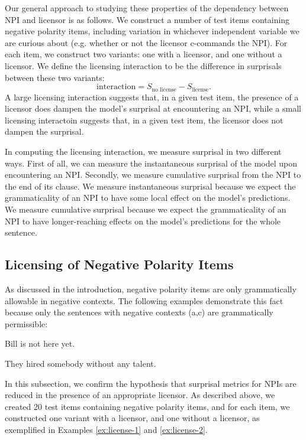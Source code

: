 \documentclass[11pt, round]{article}
\begin{document}
Our general approach to studying these properties of the dependency between NPI and licensor is as follows. We construct a number of test items containing negative polarity items, including variation in whichever independent variable we are curious about (e.g. whether or not the licensor c-commands the NPI). For each item, we construct two variants: one with a licensor, and one without a licensor. We define the licensing interaction to be the difference in surprisals between these two variants:
\[ \textrm{interaction} = S_{\textrm{no license}} - S_{\textrm{license}}. \]
A large licensing interaction suggests that, in a given test item, the presence of a licensor does dampen the model's surprisal at encountering an NPI, while a small licensing interactoin suggests that, in a given test item, the licensor does not dampen the surprisal.

In computing the licensing interaction, we measure surprisal in two different ways. First of all, we can measure the instantaneous surprisal of the model upon encountering an NPI. Secondly, we measure cumulative surprisal from the NPI to the end of its clause. We measure instantaneous surprisal because we expect the grammaticality of an NPI to have some local effect on the model's predictions. We measure cumulative surprisal because we expect the grammaticality of an NPI to have longer-reaching effects on the model's predictions for the whole sentence.

\subsection{Licensing of Negative Polarity Items}
\label{sec:basic}

As discussed in the introduction, negative polarity items are only grammatically allowable in negative contexts. The following examples demonstrate this fact because only the sentences with negative contexts (a,c) are grammatically permissible:
\begin{exe}
\ex\label{ex:license-1}
\begin{xlist}
\ex Bill is not here yet.
\end{xlist}
\ex\label{ex:license-2}
\begin{xlist}
\ex They hired somebody without any talent.
\end{xlist}
\end{exe}
In this subsection, we confirm the hypothesis that surprisal metrics for NPIs are reduced in the presence of an appropriate licensor. As described above, we created 20 test items containing negative polarity items, and for each item, we constructed one variant with a licensor, and one without a licensor, as exemplified in Examples \ref{ex:license-1} and \ref{ex:license-2}.
\end{document}
